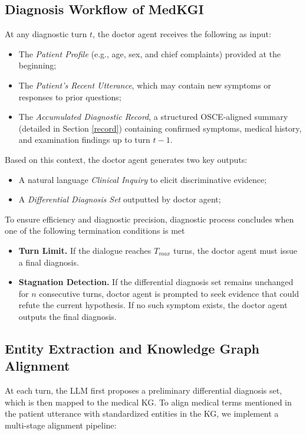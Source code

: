 \documentclass[11pt]{article}
\newcommand{\eg}{e.g.,\xspace}
\newcommand{\tool}{MedKGI{\xspace}}
\newcommand{\Doctor}{doctor agent\xspace}
\begin{document}
\subsection{Diagnosis Workflow of \tool{}}

At any diagnostic turn $t$, the \Doctor receives the following as input:

\begin{itemize}
	\item The \textit{Patient Profile} (\eg age, sex, and chief complaints) provided at the beginning;
	\item The \textit{Patient's Recent Utterance}, which may contain new symptoms or responses to prior questions;
	\item The \textit{Accumulated Diagnostic Record}, a structured OSCE-aligned summary (detailed in Section \ref{record}) containing confirmed symptoms, medical history, and examination findings up to turn $t-1$.
	
\end{itemize}

Based on this context, the \Doctor generates two key outputs:

\begin{itemize}
	\item A natural language \textit{Clinical Inquiry} to elicit discriminative evidence;
	\item A \textit{Differential Diagnosis Set} outputted by \Doctor;
\end{itemize}

To ensure efficiency and diagnostic precision,  diagnostic process concludes when one of the following termination conditions is met 

\begin{itemize}
	\item \textbf{Turn Limit.} If the dialogue reaches $T_{max}$ turns, the \Doctor must issue a final diagnosis.
	\item \textbf{Stagnation Detection.} If the differential diagnosis set remains unchanged for $n$ consecutive turns, \Doctor is prompted to seek evidence that could refute the current hypothesis. If no such symptom exists, the \Doctor outputs the final diagnosis.
\end{itemize}



\subsection{Entity Extraction and Knowledge Graph Alignment}
At each turn, the LLM first proposes a preliminary differential diagnosis set, which is then mapped to the medical KG.
To align medical terms mentioned in the patient utterance with standardized entities in the KG, we implement a multi-stage alignment pipeline:
\end{document}
